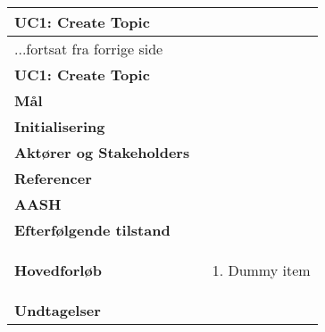 \begin{center} \centering \label{ucCreateTopic}
	\begin{longtable}{|p{4.6cm}|p{9.4cm}|}  %
	\hline
		\multicolumn{2}{|l|}{\textbf{UC1: Create Topic}} \\\hline
		\endfirsthead
		
		\multicolumn{2}{l}{...fortsat fra forrige side} \\ \hline %
		\multicolumn{2}{|l|}{\textbf{UC1: Create Topic}} \\\hline
		\endhead	
		
		\textbf{Mål}						&%
		\\\hline
		\textbf{Initialisering}			&%
		\\\hline
		\textbf{Aktører og Stakeholders}	&%
		\\\hline 
		\textbf{Referencer}				&%
		\\\hline
		\textbf{AASH}					&%
		\\\hline
		\textbf{Efterfølgende tilstand}	&%
		\\\hline
		\textbf{Hovedforløb}					
			&\begin{enumerate}
				
				\item Dummy item
			\end{enumerate}\\\hline
		\textbf{Undtagelser}
			&			
			\\\hline
	\end{longtable} 
\end{center}